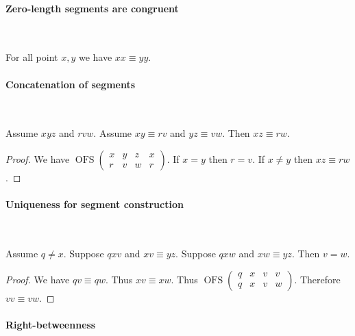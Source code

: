 \documentclass{article}
\newcommand{\Cong}[4]{#1 #2 \equiv #3 #4}
\newcommand{\Betw}[3]{#1 #2 #3}
\newcommand{\OFS}[8]{\operatorname{OFS}
\left(\begin{smallmatrix}%
#1 & #2 & #3 & #4 \\
#5 & #6 & #7 & #8
\end{smallmatrix}\right)%
}
\begin{document}
  \paragraph{Zero-length segments are congruent}\

  \begin{forthel}
    \begin{lemma} %
      For all point $x, y$ we have $\Cong{x}{x}{y}{y}$.
    \end{lemma}
  \end{forthel}


  \paragraph{Concatenation of segments}\

  \begin{forthel}
    \begin{lemma} %
      Assume $\Betw{x}{y}{z}$ and $\Betw{r}{v}{w}$.
      Assume $\Cong{x}{y}{r}{v}$ and $\Cong{y}{z}{v}{w}$.
      Then $\Cong{x}{z}{r}{w}$.
    \end{lemma}
    \begin{proof}
      We have $\OFS{x}{y}{z}{x}{r}{v}{w}{r}$. %
      If $x = y$ then $r = v$.                %
      If $x \neq y$ then $\Cong{x}{z}{r}{w}$. %
    \end{proof}
  \end{forthel}


  \paragraph{Uniqueness for segment construction}\

  \begin{forthel}
    \begin{lemma} %
      Assume $q \neq x$.
      Suppose $\Betw{q}{x}{v}$ and $\Cong{x}{v}{y}{z}$.
      Suppose $\Betw{q}{x}{w}$ and $\Cong{x}{w}{y}{z}$.
      Then $v = w$.
    \end{lemma}
    \begin{proof}
      We have $\Cong{q}{v}{q}{w}$.
      Thus $\Cong{x}{v}{x}{w}$.
      Thus $\OFS{q}{x}{v}{v}{q}{x}{v}{w}$.
      Therefore $\Cong{v}{v}{v}{w}$.
    \end{proof}
  \end{forthel}


  \paragraph{Right-betweenness}\
\end{document}
